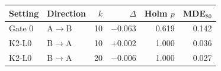 \begin{tabular}{llrrrr}
\hline
Setting & Direction & $k$ & $\Delta$ & Holm $p$ & MDE$_{80}$ \\
\hline
Gate 0 & A$\to$B & 10 & $-$0.063 & 0.619 & 0.142 \\
K2-L0 & B$\to$A & 10 & $+$0.002 & 1.000 & 0.036 \\
K2-L0 & B$\to$A & 20 & $-$0.006 & 1.000 & 0.027 \\
\hline
\end{tabular}
